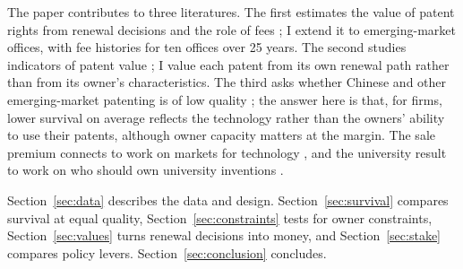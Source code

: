 The paper contributes to three literatures. The first estimates the value of patent rights from renewal decisions
\citep{PakesSchankerman1984,Pakes1986,SchankermanPakes1986,Lanjouw1998,Schankerman1998,LanjouwPakesPutnam1998,Bessen2008}
and the role of fees \citep{deRassenfosseVanPottelsberghe2013}; I extend it to emerging-market
offices, with fee histories for ten offices over 25 years. The second studies indicators of patent value
\citep{HarhoffSchererVopel2003,HallJaffeTrajtenberg2005,KoganEtAl2017}; I value each patent from its own renewal
path rather than from its owner's characteristics. The third asks whether Chinese and other emerging-market patenting
is of low quality \citep{HuJefferson2009,LiegsalzWagner2013,DangMotohashi2015,HuZhangZhao2017,WeiXieZhang2017}; the answer here is that, for firms,
lower survival on average reflects the technology rather than the owners' ability to use their patents, although
owner capacity matters at the margin. The sale premium connects to
work on markets for technology
\citep{AroraFosfuriGambardella2001,Serrano2010,Serrano2018,GalassoSchankermanSerrano2013,AkcigitCelikGreenwood2016},
and the university result to work on who should own university inventions \citep{HvideJones2018}.

Section~\ref{sec:data} describes the data and design. Section~\ref{sec:survival} compares survival at equal
quality, Section~\ref{sec:constraints} tests for owner constraints, Section~\ref{sec:values} turns renewal decisions
into money, and Section~\ref{sec:stake} compares policy levers. Section~\ref{sec:conclusion} concludes.

